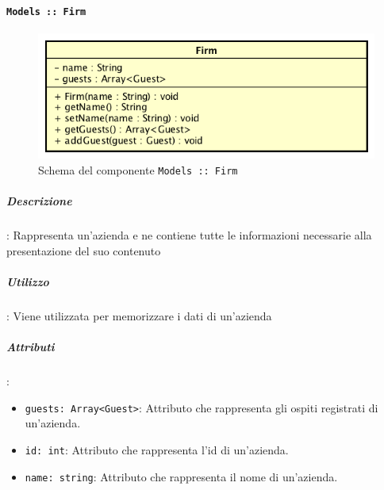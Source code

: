 \documentclass[../DefinizioneDiProdotto_v2.0.0.tex]{subfiles}
\begin{document}
\newpage
	\paragraph{\texttt{Models :: Firm}}
	\acapo
	\begin{figure}[!h]
		\centering
		\includegraphics[scale=0.6]{Architettura/Front-End/Models/Firm.png}
		\caption{Schema del componente \texttt{Models :: Firm}}
	\end{figure}


		\subparagraph{Descrizione}: Rappresenta un'azienda e ne contiene tutte le informazioni necessarie alla presentazione del suo contenuto

		\subparagraph{Utilizzo}: Viene utilizzata per memorizzare i dati di un'azienda

		\subparagraph{Attributi}:
		      \begin{itemize}
		      	\item \texttt{guests: Array<Guest>}:
		      	      Attributo che rappresenta gli ospiti registrati di un'azienda.
		      	\item \texttt{id: int}:
		      	      Attributo che rappresenta l'id di un'azienda.
		      	\item \texttt{name: string}:
		      	      Attributo che rappresenta il nome di un'azienda.
		      \end{itemize}
\end{document}
